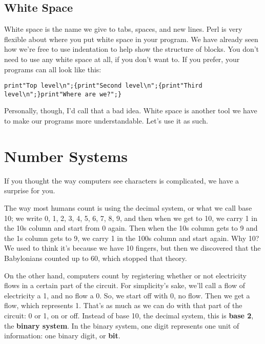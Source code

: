 \documentclass[a4paper,11pt]{book}
\begin{document}
\noindent 

\subsection{White Space}

\noindent White space is the name we give to tabs, spaces, and new lines. Perl is very flexible about where you put white space in your program. We have already seen how we're free to use indentation to help show the structure of blocks. You don't need to use any white space at all, if you don't want to. If you prefer, your programs can all look like this:

\noindent 

\noindent \texttt{print"Top level\textbackslash n";\{print"Second level\textbackslash n";\{print"Third level\textbackslash n";\}print"Where are we?";\}}

\noindent 

\noindent Personally, though, I'd call that a bad idea. White space is another tool we have to make our programs more understandable. Let's use it as such.

\noindent 

\section{Number Systems}

\noindent 

\noindent If you thought the way computers see characters is complicated, we have a surprise for you.

\noindent 

\noindent The way most humans count is using the decimal system, or what we call base 10; we write 0, 1, 2, 3, 4, 5, 6, 7, 8, 9, and then when we get to 10, we carry 1 in the 10s column and start from 0 again. Then when the 10s column gets to 9 and the 1s column gets to 9, we carry 1 in the 100s column and start again. Why 10? We used to think it's because we have 10 fingers, but then we discovered that the Babylonians counted up to 60, which stopped that theory.

\noindent 

\noindent On the other hand, computers count by registering whether or not electricity flows in a certain part of the circuit. For simplicity's sake, we'll call a flow of electricity a 1, and no flow a 0. So, we start off with 0, no flow. Then we get a flow, which represents 1. That's as much as we can do with that part of the circuit: 0 or 1, on or off. Instead of base 10, the decimal system, this is \textbf{base 2}, the \textbf{binary system}. In the binary system, one digit represents one unit of information: one binary digit, or \textbf{bit}.
\end{document}
